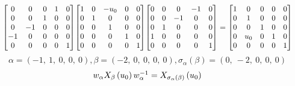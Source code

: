 \documentclass[11pt]{article}
\theoremstyle{definition}
\begin{document}
\[
\scaletoalign{\textwidth}{{\left[\begin{matrix}0 & 0 & 0 & 1 & 0\\0 & 0 & 1 & 0 & 0\\0 & -1 & 0 & 0 & 0\\-1 & 0 & 0 & 0 & 0\\0 & 0 & 0 & 0 & 1\end{matrix}\right]} {\left[\begin{matrix}1 & 0 & - u_{0} & 0 & 0\\0 & 1 & 0 & 0 & 0\\0 & 0 & 1 & 0 & 0\\0 & 0 & 0 & 1 & 0\\0 & 0 & 0 & 0 & 1\end{matrix}\right]} {\left[\begin{matrix}0 & 0 & 0 & -1 & 0\\0 & 0 & -1 & 0 & 0\\0 & 1 & 0 & 0 & 0\\1 & 0 & 0 & 0 & 0\\0 & 0 & 0 & 0 & 1\end{matrix}\right]} = {\left[\begin{matrix}1 & 0 & 0 & 0 & 0\\0 & 1 & 0 & 0 & 0\\0 & 0 & 1 & 0 & 0\\0 & u_{0} & 0 & 1 & 0\\0 & 0 & 0 & 0 & 1\end{matrix}\right]}}
\]
\[
\alpha = \left( -1, \  1, \  0, \  0, \  0\right), \beta = \left( -2, \  0, \  0, \  0, \  0\right), \sigma_{\alpha}(\beta) = \left( 0, \  -2, \  0, \  0, \  0\right)
\]
\[
\scaletoalign{\textwidth}{w_{\alpha} X_{\beta}\left(u_{0}\right) w_{\alpha}^{-1} = X_{\sigma_{\alpha}\left(\beta\right)}\left(u_{0}\right)}
\]
\end{document}
